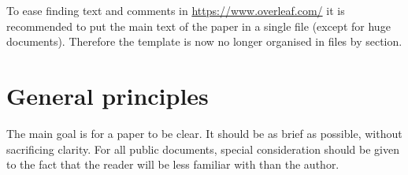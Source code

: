 To ease finding text and comments in  \url{https://www.overleaf.com/} it is recommended to put the main text of the paper in a single file (except for huge documents). Therefore the template is now no longer organised in files by section.

\section{General principles}

The main goal is for a paper to be clear. It should be as brief as
possible, without sacrificing clarity. For all public documents,
special consideration should be given to the fact that the reader will
be less familiar with \lhcb than the author.

